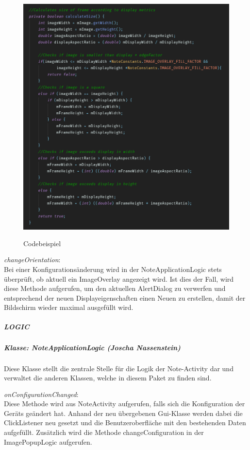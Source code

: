 \begin{figure}[H]
\centering
\begin{minipage}[t]{1\textwidth} %
\caption{Codebeispiel} %
\includegraphics[width=1 \textwidth]{img/note_imageOverlayCodeExample}\\ %
\end{minipage}
\end{figure}

\textit{changeOrientation}:\\
Bei einer Konfigurationsänderung wird in der NoteApplicationLogic stets überprüft, ob aktuell ein ImageOverlay angezeigt wird. Ist dies der Fall, wird diese Methode aufgerufen, um den aktuellen AlertDialog zu verwerfen und entsprechend der neuen Displayeigenschaften einen Neuen zu erstellen, damit der Bildschirm wieder maximal ausgefüllt wird.

\subparagraph{LOGIC}
\subparagraph{Klasse: NoteApplicationLogic (Joscha Nassenstein)}
Diese Klasse stellt die zentrale Stelle für die Logik der Note-Activity dar und verwaltet die anderen Klassen, welche in diesem Paket zu finden sind.

\textit{onConfigurationChanged}:\\
Diese Methode wird aus NoteActivity aufgerufen, falls sich die Konfiguration der Geräts geändert hat. Anhand der neu übergebenen Gui-Klasse werden dabei die ClickListener neu gesetzt und die Benutzeroberfläche mit den bestehenden Daten aufgefüllt. Zusätzlich wird die Methode changeConfiguration in der ImagePopupLogic aufgerufen.

